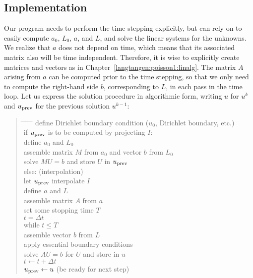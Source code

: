 \subsection{Implementation}
\label{langtangen:timedep:diffusion1:impl}

Our program needs to perform the time stepping explicitly, but can
rely on \fenics{} to easily compute $a_0$, $L_0$, $a$, and $L$,
and solve the linear systems for the unknowns.
We realize that $a$ does not depend on time, which means that its
associated matrix also will be time independent. Therefore, it is wise to
explicitly
create matrices and vectors as in Chapter~\ref{langtangen:poisson1:linalg}.
The matrix $A$ arising from $a$ can be computed prior to the time stepping,
so that we
only need to compute the right-hand side $b$, corresponding to $L$,
in each pass in the time loop. Let us express the
solution procedure in algorithmic form, writing 
$u$ for $u^k$ and $u_{\rm prev}$
for the previous solution $u^{k-1}$:

\begin{quote}
\begin{tabbing}
\hspace*{0.5cm}\= \hspace{0.5cm} \= \hspace{0.5cm} \=
\hspace{0.5cm} \= \hspace{0.5cm} \= \kill
define Dirichlet boundary condition ($u_0$, Dirichlet boundary, etc.)\\
if $u_{\rm prev}$ is to be computed by projecting $I$:\\
\>define $a_0$ and $L_0$\\
\> assemble matrix $M$ from $a_0$ and vector $b$ from $L_0$\\
\> solve $MU=b$ and store $U$ in $u_{\rm prev}$\\
else:  (interpolation)\\
\> let $u_{\rm prev}$ interpolate $I$\\
define $a$ and $L$\\
assemble matrix $A$ from $a$\\
set some stopping time $T$\\
$t=\Delta t$\\
while $t\leq T$\\
\> assemble vector $b$ from $L$\\
\> apply essential boundary conditions\\
\> solve $AU=b$ for $U$ and store in $u$\\
\> $t\leftarrow t + \Delta t$\\
\> $u_{\rm prev} \leftarrow u$ (be ready for next step)
\end{tabbing}
\end{quote}

